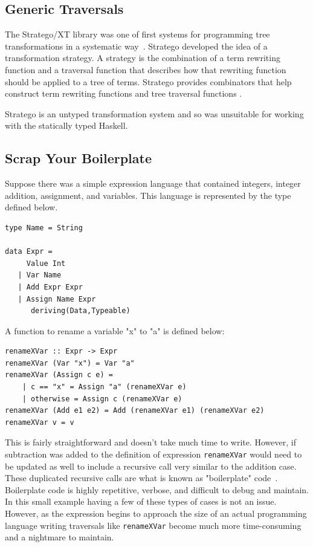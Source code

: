 \subsection{Generic Traversals}
The Stratego/XT library was one of first systems for programming tree transformations in a systematic way~\citep{stratego}. Stratego developed the idea of a transformation strategy. A strategy is the combination of a term rewriting function and a traversal function that describes how that rewriting function should be applied to a tree of terms. Stratego provides combinators that help construct term rewriting functions and tree traversal functions \citep{stratego}.

Stratego is an untyped transformation system and so was unsuitable for working with the statically typed Haskell.  
\subsection{Scrap Your Boilerplate}\label{syb}

	Suppose there was a simple expression language that contained integers, integer addition, assignment, and variables. This language is represented by the type defined below.
	
	\begin{lstlisting}[caption={A simple expression type.},label=expression]
type Name = String

data Expr =
     Value Int
   | Var Name
   | Add Expr Expr
   | Assign Name Expr
      deriving(Data,Typeable)
	\end{lstlisting}
	
	A function to rename a variable "x" to "a" is defined below:
	
	\begin{lstlisting}
renameXVar :: Expr -> Expr
renameXVar (Var "x") = Var "a"
renameXVar (Assign c e) = 
	| c == "x" = Assign "a" (renameXVar e)
	| otherwise = Assign c (renameXVar e)
renameXVar (Add e1 e2) = Add (renameXVar e1) (renameXVar e2)
renameXVar v = v
	\end{lstlisting}
	
	This is fairly straightforward and doesn't take much time to write. However, if subtraction was added to the definition of expression \texttt{renameXVar} would need to be updated as well to include a recursive call very similar to the addition case. These duplicated recursive calls are what is known as "boilerplate" code~\citep{syb}. Boilerplate code is highly repetitive, verbose, and difficult to debug and maintain.  In this small example having a few of these types of cases is not an issue. However, as the expression begins to approach the size of an actual programming language writing traversals like \texttt{renameXVar} become much more time-consuming and a nightmare to maintain. 
	
